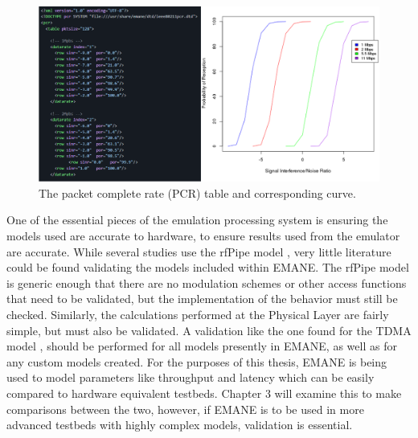 \begin{figure}[!ht]
    \centering
    \includegraphics[width=\textwidth,keepaspectratio]{Images/Chpt2/emane_pcr.png}
    \caption{The packet complete rate (PCR) table and corresponding curve.}
    \label{emane_pcr}
\end{figure}

One of the essential pieces of the emulation processing system is ensuring the models used are accurate to hardware, to ensure results used from the emulator are accurate.
While several studies use the rfPipe model \cite{rfPipe1, rfPipe2, rfPipe3}, very little literature could be found validating the models included within EMANE.
The rfPipe model is generic enough that there are no modulation schemes or other access functions that need to be validated, but the implementation of the behavior must still be checked.
Similarly, the calculations performed at the Physical Layer are fairly simple, but must also be validated.
A validation like the one found for the TDMA model \cite{emane_tdma}, should be performed for all models presently in EMANE, as well as for any custom models created.
For the purposes of this thesis, EMANE is being used to model parameters like throughput and latency which can be easily compared to hardware equivalent testbeds.
Chapter 3 will examine this to make comparisons between the two, however, if EMANE is to be used in more advanced testbeds with highly complex models, validation is essential.

